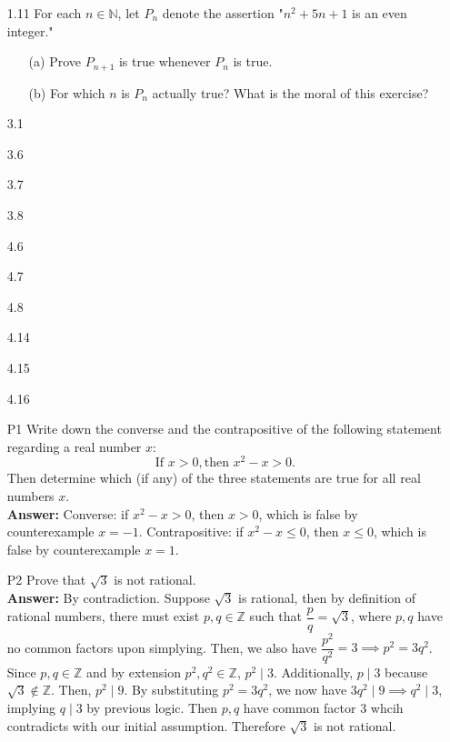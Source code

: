\documentclass{article}
\begin{document}
\begin{itemize}
\begin{itemize}
            \end{itemize}
      \item [1.11] For each $n\in\mathbb{N}$, let $P_n$ denote the assertion "$n^2+5n+1$ is an even integer."
            \begin{itemize}
                  \item [(a)] Prove $P_{n+1}$ is true whenever $P_n$ is true.
                  \item [(b)] For which $n$ is $P_n$ actually true? What is the moral of this exercise?
            \end{itemize}
      \item [3.1]
      \item [3.6]
      \item [3.7]
      \item [3.8]
      \item [4.6]
      \item [4.7]
      \item [4.8]
      \item [4.14]
      \item [4.15]
      \item [4.16]
      \item [P1] Write down the converse and the contrapositive of the following statement regarding a real number $x$: \[\text{If } x>0, \text{then } x^2-x>0.\] Then determine which (if any) of the three statements are true for all real numbers $x$.\\
            \textbf{Answer: } Converse: if $x^2-x>0$, then $x>0$, which is false by counterexample $x=-1$. Contrapositive: if $x^2-x\leq0$, then $x\leq0$, which is false by counterexample $x=1$.
      \item [P2] Prove that $\sqrt{3}$ is not rational.\\
            \textbf{Answer: } By contradiction. Suppose $\sqrt{3}$ is rational, then by definition of rational numbers, there must exist $p,q\in\mathbb{Z}$ such that $\dfrac{p}{q}=\sqrt{3}$, where $p,q$ have no common factors upon simplying. Then, we also have $\dfrac{p^2}{q^2}=3\implies p^2=3q^2$. Since $p,q\in\mathbb{Z}$ and by extension $p^2,q^2\in\mathbb{Z}$, $p^2\mid 3$. Additionally, $p\mid 3$ because $\sqrt{3}\notin\mathbb{Z}$. Then, $p^2\mid 9$. By substituting $p^2=3q^2$, we now have $3q^2\mid 9\implies q^2\mid 3$, implying $q\mid 3$ by previous logic. Then $p,q$ have common factor $3$ whcih contradicts with our initial assumption. Therefore $\sqrt{3}$ is not rational.
\end{itemize}
\end{document}
